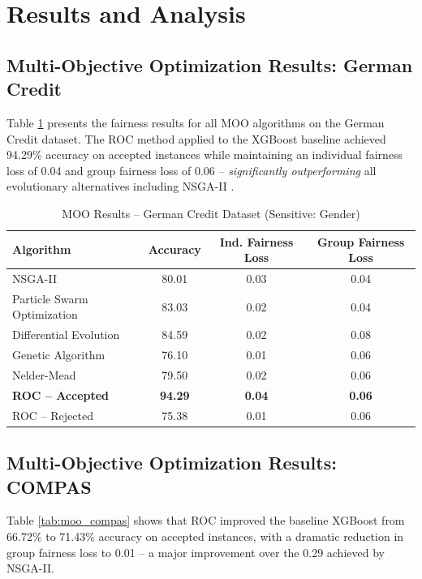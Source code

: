 \documentclass[12pt,a4paper]{article}
\begin{document}
\section{Results and Analysis}
\label{sec:moo_results}

\subsection{Multi-Objective Optimization Results: German Credit}

Table \ref{tab:moo_german} presents the fairness results for all MOO algorithms on the German Credit dataset. The ROC method applied to the XGBoost baseline achieved 94.29\% accuracy on accepted instances while maintaining an individual fairness loss of 0.04 and group fairness loss of 0.06 -- \textit{significantly outperforming} all evolutionary alternatives including NSGA-II \cite{nagpal2024multiobj}.

\begin{table}[h]
\centering
\caption{MOO Results -- German Credit Dataset (Sensitive: Gender)}
\label{tab:moo_german}
\begin{tabular}{lccc}
\toprule
\textbf{Algorithm} & \textbf{Accuracy} & \textbf{Ind. Fairness Loss} & \textbf{Group Fairness Loss} \\
\midrule
NSGA-II                     & 80.01 & 0.03 & 0.04 \\
Particle Swarm Optimization & 83.03 & 0.02 & 0.04 \\
Differential Evolution      & 84.59 & 0.02 & 0.08 \\
Genetic Algorithm           & 76.10 & 0.01 & 0.06 \\
Nelder-Mead                 & 79.50 & 0.02 & 0.06 \\
\midrule
\textbf{ROC -- Accepted}    & \textbf{94.29} & \textbf{0.04} & \textbf{0.06} \\
ROC -- Rejected             & 75.38 & 0.01 & 0.06 \\
\bottomrule
\end{tabular}
\end{table}

\subsection{Multi-Objective Optimization Results: COMPAS}

Table \ref{tab:moo_compas} shows that ROC improved the baseline XGBoost from 66.72\% to 71.43\% accuracy on accepted instances, with a dramatic reduction in group fairness loss to 0.01 -- a major improvement over the 0.29 achieved by NSGA-II.
\end{document}
